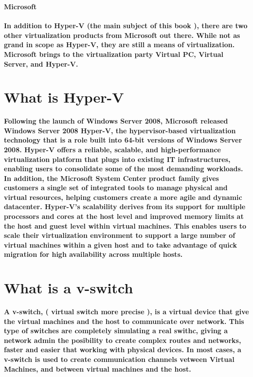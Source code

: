 \textbf{Microsoft}
\paragraph{In addition to Hyper-V (the main subject of this book ), there are two other virtualization products from Microsoft out there. 
While not as grand in scope as Hyper-V, they are still a means of virtualization. Microsoft brings to the virtualization party Virtual PC, Virtual Server, and Hyper-V. }


\section{What is Hyper-V}

\paragraph{Following the launch of Windows Server 2008, Microsoft released Windows Server 2008 Hyper-V, the hypervisor-based virtualization technology that is a role 
built into 64-bit versions of Windows Server 2008. Hyper-V offers a reliable, scalable, and high-performance virtualization platform that plugs into existing IT 
infrastructures, enabling users to consolidate some of the most demanding workloads. In addition, the Microsoft System Center product family gives customers a single 
set of integrated tools to manage physical and virtual resources, helping customers create a more agile and dynamic datacenter. Hyper-V’s scalability derives from its 
support for multiple processors and cores at the host level and improved memory limits at the host and guest level within virtual machines. This enables users to scale 
their virtualization environment to support a large number of virtual machines within a given host and to take advantage of quick migration for high availability across 
multiple hosts.}

\section{What is a v-switch}

\paragraph{A \textbf{v-switch}, ( virtual switch more precise ), is a virtual device that give the virtual machines and the host to communicate over network.
This type of switches are completely simulating a real swithc, giving a network admin the posibility to create complex routes and networks, faster and easier that working
with physical devices. In most cases, a v-switch is used to create communication channels vetween Virtual Machines, and between virtual machines and the host.}

